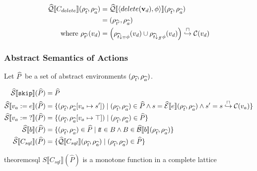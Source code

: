 \begin{align*}
    \widehat{\mathcal{Q}}\llbracket C_{delete} \rrbracket(\rho_{\widehat{t}}, \rho_{\widehat{a}})
    &= \widehat{\mathcal{Q}}\llbracket \langle delete(\mathbf{v}_d), \phi \rangle \rrbracket (\rho_{\widehat{t}}, \rho_{\widehat{a}}) \\
    &= (\rho_{\widehat{t}'}, \rho_{\widehat{a}}) \\
    \text{where } \rho_{\widehat{t}'}(v_d) &= \left( \rho_{\widehat{t} \downarrow_{?\!?} \phi}(v_d) \cup \rho_{\widehat{t} \downarrow_{f\!\!f} \phi}(v_d) \right) \overset{\sqcap}{\hookrightarrow} \mathcal{C}(v_d)
\end{align*}

\subsubsection{Abstract Semantics of Actions}

Let $\widehat{P}$ be a set of abstract environments $(\rho_{\widehat{t}}, \rho_{\widehat{a}})$.

\begin{align}
    \widehat{\mathcal{S}} \llbracket \texttt{skip} \rrbracket(\widehat{P}) &= \widehat{P} \\
    \widehat{\mathcal{S}} \llbracket v_a := e \rrbracket(\widehat{P}) &= \{(\rho_{\widehat{t}}, \rho_{\widehat{a}}[v_a \mapsto s']) \mid (\rho_{\widehat{t}}, \rho_{\widehat{a}}) \in \widehat{P} \land s = \widehat{\mathcal{E}}\llbracket e \rrbracket(\rho_{\widehat{t}}, \rho_{\widehat{a}}) \land s' = s \overset{\sqcap}{\hookrightarrow} \mathcal{C}(v_a) \} \\
    \widehat{\mathcal{S}} \llbracket v_a := \; ? \rrbracket(\widehat{P}) &= \{(\rho_{\widehat{t}}, \rho_{\widehat{a}}[v_a \mapsto \top]) \mid (\rho_{\widehat{t}}, \rho_{\widehat{a}}) \in \widehat{P} \} \\
    \widehat{\mathcal{S}} \llbracket b \rrbracket(\widehat{P}) &= \{ (\rho_{\widehat{t}}, \rho_{\widehat{a}}) \in \widehat{P} \mid t\!t \in B \land B \in \widehat{\mathcal{B}}\llbracket b \rrbracket(\rho_{\widehat{t}}, \rho_{\widehat{a}}) \} \\
    \widehat{\mathcal{S}} \llbracket C_{sql} \rrbracket(\widehat{P}) &= \{\widehat{\mathcal{Q}}\llbracket C_{sql} \rrbracket(\rho_{\widehat{t}}, \rho_{\widehat{a}}) \mid (\rho_{\widehat{t}}, \rho_{\widehat{a}}) \in \widehat{P} \}
\end{align}

\begin{restatable}{theorem}{csql}\label{thm:csql}
    $S\llbracket C_{sql}\rrbracket(\widehat{P})$ is a monotone function in a complete lattice
\end{restatable}


